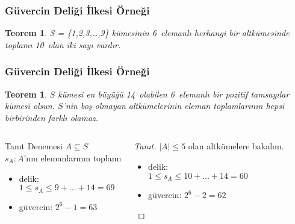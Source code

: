 \documentclass[dvipsnames]{beamer}
\theoremstyle{definition}
\theoremstyle{example}
\theoremstyle{plain}
\newtheorem{teorem}[theorem]{Teorem}
\begin{document}
\begin{frame}
  \frametitle{Güvercin Deliği İlkesi Örneği}

  \begin{teorem}
    S = \{1,2,3,\dots,9\} kümesinin 6~elemanlı herhangi bir altkümesinde\\
    toplamı 10~olan iki sayı vardır.
  \end{teorem}
\end{frame}

\begin{frame}
  \frametitle{Güvercin Deliği İlkesi Örneği}

  \begin{teorem}
    $S$ kümesi en büyüğü 14~olabilen 6~elemanlı bir pozitif tamsayılar kümesi
    olsun. $S$'nin boş olmayan altkümelerinin eleman toplamlarının hepsi
    birbirinden farklı olamaz.
  \end{teorem}

  \pause
  \begin{columns}[t]
    \begin{block}{Tanıt Denemesi}
      $A \subseteq S$\\
      $s_A: A$'nın elemanlarının toplamı

      \pause
      \begin{itemize}
        \item delik:\\
          $1 \leq s_A \leq 9 + \dots + 14 = 69$
        \item güvercin: $2^6 - 1 = 63$
      \end{itemize}
    \end{block}

    \pause
    \begin{proof}[Tanıt]
      $|A| \leq 5$ olan altkümelere bakalım.

      \pause
      \begin{itemize}
        \item delik:\\
          $1 \leq s_A \leq 10 + \dots + 14 = 60$
        \item güvercin: $2^6 - 2 = 62$
      \end{itemize}
    \end{proof}
  \end{columns}
\end{frame}
\end{document}
